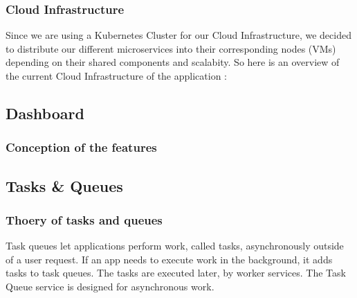 \subsubsection{Cloud Infrastructure}
Since we are using a Kubernetes Cluster for our Cloud Infrastructure, we decided to distribute our different microservices into their corresponding nodes (VMs) depending on their shared components and scalabity. So here is an overview of the current Cloud Infrastructure of the application : 
\linebreak
{}
\subsection{Dashboard}
\subsubsection{Conception of the features}
\newpage
\subsection{Tasks \& Queues}
\subsubsection{Thoery of tasks and queues}
Task queues let applications perform work, called tasks, asynchronously outside of a user request. If an app needs to execute work in the background, it adds tasks to task queues. The tasks are executed later, by worker services. The Task Queue service is designed for asynchronous work.
\linebreak
{}
